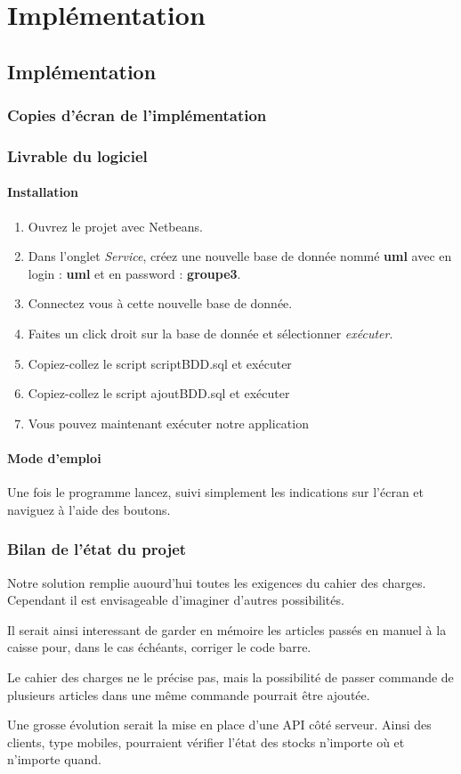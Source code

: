 \part{Implémentation}

\chapter{Implémentation}

\section{Copies d'écran de l'implémentation}

\section{Livrable du logiciel}

\subsection{Installation}
\begin{enumerate}
	\item Ouvrez le projet avec Netbeans.
	\item Dans l'onglet \textit{Service}, créez une nouvelle base de donnée nommé \textbf{uml} avec en login : \textbf{uml} et en password : \textbf{groupe3}. 
	\item Connectez vous à cette nouvelle base de donnée.
	\item Faites un click droit sur la base de donnée et sélectionner \textit{exécuter}.
	\item Copiez-collez le script scriptBDD.sql et exécuter
	\item Copiez-collez le script ajoutBDD.sql et exécuter
	\item Vous pouvez maintenant exécuter notre application
\end{enumerate}

\subsection{Mode d'emploi}
Une fois le programme lancez, suivi simplement les indications sur l'écran et naviguez à l'aide des boutons.

\section{Bilan de l'état du projet}
Notre solution remplie auourd'hui toutes les exigences du cahier des charges. Cependant il est envisageable d'imaginer d'autres possibilités. 

Il serait ainsi interessant de garder en mémoire les articles passés en manuel à la caisse pour, dans le cas échéants, corriger le code barre.

Le cahier des charges ne le précise pas, mais la possibilité de passer commande de plusieurs articles dans une même commande pourrait être ajoutée. 

Une grosse évolution serait la mise en place d'une API côté serveur. Ainsi des clients, type mobiles, pourraient vérifier l'état des stocks n'importe où et n'importe quand. 